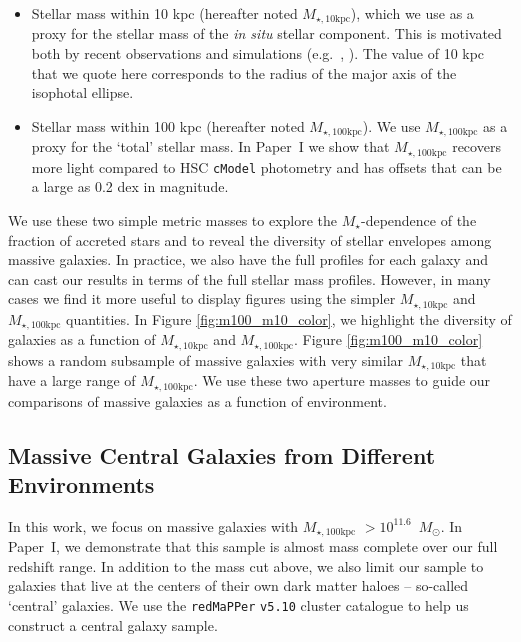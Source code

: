 \documentclass[a4paper,fleqn,usenatbib]{mnras}
\def\msun{$M_\odot$}
\def\redm{\texttt{redMaPPer}}
\def\cmodel{\texttt{cModel}}
\def\mstar{{$M_{\star}$}}
\def\minn{{$M_{\star,10\mathrm{kpc}}$}}
\def\mtot{{$M_{\star,100\mathrm{kpc}}$}}
\begin{document}
    \begin{itemize}
    
        \item Stellar mass within 10 kpc (hereafter noted \minn{}), which we use 
            as a proxy for the stellar mass of the \textit{in situ} stellar 
            component. 
            This is motivated both by recent observations and simulations 
            (e.g.~\citealt{vanDokkum2010}, \citealt{RodriguezGomez2016}). 
            The value of 10 kpc that we quote here corresponds to the radius of the 
            major axis of the isophotal ellipse.
            
        \item Stellar mass within 100 kpc (hereafter noted \mtot{}). 
            We use \mtot{} as a proxy for the `total' stellar mass. 
            In Paper~I we show that \mtot{} recovers more light compared to 
            HSC \cmodel{} photometry and has offsets that can be a large as 0.2 dex 
            in magnitude.        
               
   \end{itemize}
   
   We use these two simple metric masses to explore the \mstar{}-dependence of the 
   fraction of accreted stars and to reveal the diversity of stellar envelopes among 
   massive galaxies. 
   In practice, we also have the full profiles for each galaxy and can cast our 
   results in terms of the full stellar mass profiles. 
   However, in many cases we find it more useful to display figures using the simpler 
   \minn{} and \mtot{} quantities. 
   In Figure \ref{fig:m100_m10_color}, we highlight the diversity of galaxies as a 
   function of \minn{} and \mtot{}. 
   Figure \ref{fig:m100_m10_color} shows a random subsample of massive galaxies with 
   very similar \minn{} that have a large range of \mtot{}. 
   We use these two aperture masses to guide our comparisons of massive galaxies 
   as a function of environment.  
    
\subsection{Massive Central Galaxies from Different Environments}
    \label{ssec:cen}
         
    In this work, we focus on massive galaxies with \mtot{} $>10^{11.6}$~\msun{}. 
    In Paper~I, we demonstrate that this sample is almost mass complete over our full 
    redshift range. 
    In addition to the mass cut above, we also limit our sample to galaxies that live 
    at the centers of their own dark matter haloes -- so-called `central' galaxies. 
    We use the \redm{} \texttt{v5.10} \citep{Rykoff2014, Rozo2015b} cluster catalogue 
    to help us construct a central galaxy sample.
    
\end{document}
